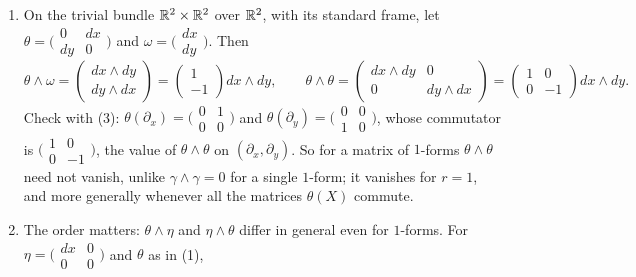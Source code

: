 \begin{example}\label{connections:example-products}
\begin{enumerate}
\item On the trivial bundle $\mathbb{R}^2 \times \mathbb{R}^2$ over $\mathbb{R}^2$, with its standard frame, let $\theta = \bigl(\begin{smallmatrix} 0 & dx\\ dy & 0\end{smallmatrix}\bigr)$ and $\omega = \bigl(\begin{smallmatrix} dx\\ dy\end{smallmatrix}\bigr)$.
Then
\[
\theta \wedge \omega = \begin{pmatrix} dx \wedge dy\\ dy \wedge dx\end{pmatrix} = \begin{pmatrix} 1\\ -1\end{pmatrix}dx \wedge dy, \qquad
\theta \wedge \theta = \begin{pmatrix} dx \wedge dy & 0\\ 0 & dy \wedge dx\end{pmatrix} = \begin{pmatrix} 1 & 0\\ 0 & -1\end{pmatrix}dx \wedge dy .
\]
Check with (3): $\theta(\partial_x) = \bigl(\begin{smallmatrix} 0 & 1\\ 0 & 0\end{smallmatrix}\bigr)$ and $\theta(\partial_y) = \bigl(\begin{smallmatrix} 0 & 0\\ 1 & 0\end{smallmatrix}\bigr)$, whose commutator is
$\bigl(\begin{smallmatrix} 1 & 0\\ 0 & -1\end{smallmatrix}\bigr)$, the value of $\theta \wedge \theta$ on $(\partial_x, \partial_y)$. So for a matrix of $1$-forms $\theta \wedge \theta$ need not vanish, unlike
$\gamma \wedge \gamma = 0$ for a single $1$-form; it vanishes for $r = 1$, and more generally whenever all the matrices $\theta(X)$ commute.
\item The order matters: $\theta \wedge \eta$ and $\eta \wedge \theta$ differ in general even for $1$-forms. For $\eta = \bigl(\begin{smallmatrix} dx & 0\\ 0 & 0\end{smallmatrix}\bigr)$ and $\theta$ as in (1),

\end{enumerate}
\end{example}
